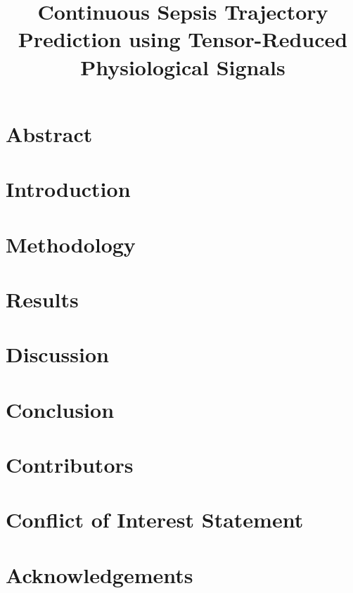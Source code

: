 \documentclass[a4paper,12pt]{article}
\title{Continuous Sepsis Trajectory Prediction using Tensor-Reduced Physiological Signals}
\date{}
\begin{document}
    \maketitle
    
    \clearpage
    
    \section*{Abstract} \label{sec:abstract}
    
    
    \section*{Introduction} \label{sec:intro}
    
    
    \section*{Methodology} \label{sec:methods}
    
    
    \section*{Results} \label{sec:results}
    
    
    \section*{Discussion} \label{sec:discussion}
    
    
    \section*{Conclusion} \label{sec:conclusion}
    
    
    \section*{Contributors}
    
    
    \section*{Conflict of Interest Statement}
    
    
    \section*{Acknowledgements}
    

    
    
    \printbibliography 
\end{document}
